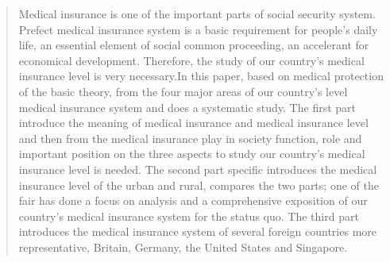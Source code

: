 

\begin{abstract}

Medical insurance is one of the important parts of social security system. Prefect medical insurance system is a basic requirement for people’s daily life, an essential element of social common proceeding, an accelerant for economical development. Therefore, the study of our country’s medical insurance level is very necessary.In this paper, based on medical protection of the basic theory, from the four major areas of our country’s level medical insurance system and does a systematic study. The first part introduce the meaning of medical insurance and medical insurance level and then from the medical insurance play in society function, role and important position on the three aspects to study our country's medical insurance level is needed. The second part specific introduces the medical insurance level of the urban and rural, compares the two parts; one of the fair has done a focus on analysis and a comprehensive exposition of our country's medical insurance system for the status quo. The third part introduces the medical insurance system of several foreign countries more representative, Britain, Germany, the United States and Singapore.


\end{abstract}
